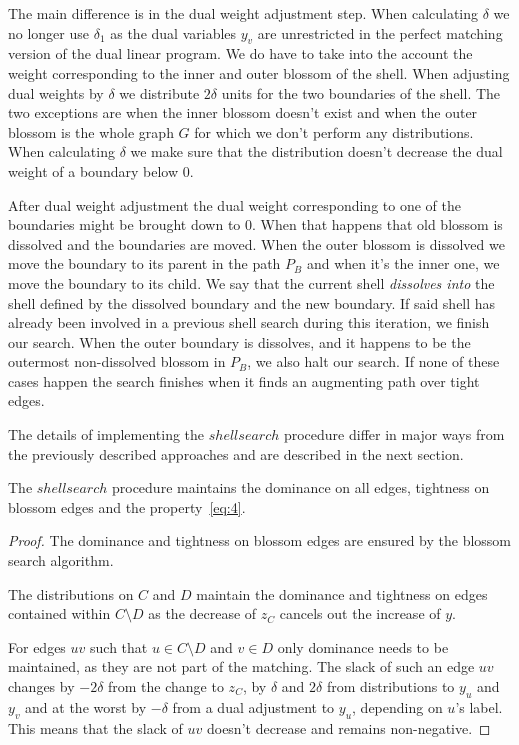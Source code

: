 The main difference is in the dual weight adjustment step. When calculating $\delta$ we no longer use $\delta_1$ as the dual variables $y_v$ are unrestricted in the perfect matching version of the dual linear program. We do have to take into the account the weight corresponding to the inner and outer blossom of the shell. When adjusting dual weights by $\delta$ we distribute $2\delta$ units for the two boundaries of the shell. The two exceptions are when the inner blossom doesn't exist and when the outer blossom is the whole graph $G$ for which we don't perform any distributions. When calculating $\delta$ we make sure that the distribution doesn't decrease the dual weight of a boundary below $0$.

After dual weight adjustment the dual weight corresponding to one of the boundaries might be brought down to $0$. When that happens that old blossom is dissolved and the boundaries are moved. When the outer blossom is dissolved we move the boundary to its parent in the path $P_B$ and when it's the inner one, we move the boundary to its child. We say that the current shell \textit{dissolves into} the shell defined by the dissolved boundary and the new boundary. If said shell has already been involved in a previous shell search during this iteration, we finish our search. When the outer boundary is dissolves, and it happens to be the outermost non-dissolved blossom in $P_B$, we also halt our search. If none of these cases happen the search finishes when it finds an augmenting path over tight edges.

The details of implementing the $shellsearch$ procedure differ in major ways from the previously described approaches and are described in the next section.

\begin{lemma}\label{lem:search_correctness}
    The $shellsearch$ procedure maintains the dominance on all edges, tightness on blossom edges and the property~\ref{eq:4}.
\end{lemma}

\begin{proof}
    The dominance and tightness on blossom edges are ensured by the blossom search algorithm. 
    
    The distributions on $C$ and $D$ maintain the dominance and tightness on edges contained within $C \setminus D$ as the decrease of $z_C$ cancels out the increase of $y$. 
    
    For edges $uv$ such that $u \in C \setminus D$ and $v \in D$ only dominance needs to be maintained, as they are not part of the matching. The slack of such an edge $uv$ changes by $-2\delta$ from the change to $z_C$, by $\delta$ and $2\delta$ from distributions to $y_u$ and $y_v$ and at the worst by $-\delta$ from a dual adjustment to $y_u$, depending on $u$'s label. This means that the slack of $uv$ doesn't decrease and remains non-negative.
\end{proof}

